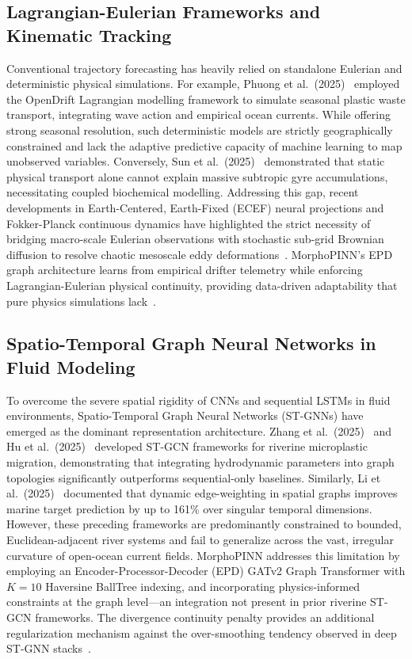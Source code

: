 \documentclass[conference]{IEEEtran}
\begin{document}
\subsection{Lagrangian-Eulerian Frameworks and Kinematic Tracking}
Conventional trajectory forecasting has heavily relied on standalone Eulerian and deterministic physical simulations. For example, Phuong et al.\ (2025)~\cite{ref2} employed the OpenDrift Lagrangian modelling framework to simulate seasonal plastic waste transport, integrating wave action and empirical ocean currents. While offering strong seasonal resolution, such deterministic models are strictly geographically constrained and lack the adaptive predictive capacity of machine learning to map unobserved variables. Conversely, Sun et al.\ (2025)~\cite{ref14} demonstrated that static physical transport alone cannot explain massive subtropic gyre accumulations, necessitating coupled biochemical modelling. Addressing this gap, recent developments in Earth-Centered, Earth-Fixed (ECEF) neural projections and Fokker-Planck continuous dynamics have highlighted the strict necessity of bridging macro-scale Eulerian observations with stochastic sub-grid Brownian diffusion to resolve chaotic mesoscale eddy deformations~\cite{ref25, ref26, ref27}. MorphoPINN's EPD graph architecture learns from empirical drifter telemetry while enforcing Lagrangian-Eulerian physical continuity, providing data-driven adaptability that pure physics simulations lack~\cite{ref38}.

\subsection{Spatio-Temporal Graph Neural Networks in Fluid Modeling}
To overcome the severe spatial rigidity of CNNs and sequential LSTMs in fluid environments, Spatio-Temporal Graph Neural Networks (ST-GNNs) have emerged as the dominant representation architecture. Zhang et al.\ (2025)~\cite{ref1} and Hu et al.\ (2025)~\cite{ref3} developed ST-GCN frameworks for riverine microplastic migration, demonstrating that integrating hydrodynamic parameters into graph topologies significantly outperforms sequential-only baselines. Similarly, Li et al.\ (2025)~\cite{ref15} documented that dynamic edge-weighting in spatial graphs improves marine target prediction by up to 161\% over singular temporal dimensions. However, these preceding frameworks are predominantly constrained to bounded, Euclidean-adjacent river systems and fail to generalize across the vast, irregular curvature of open-ocean current fields. MorphoPINN addresses this limitation by employing an Encoder-Processor-Decoder (EPD) GATv2 Graph Transformer with $K=10$ Haversine BallTree indexing, and incorporating physics-informed constraints at the graph level---an integration not present in prior riverine ST-GCN frameworks. The divergence continuity penalty provides an additional regularization mechanism against the over-smoothing tendency observed in deep ST-GNN stacks~\cite{ref24, ref36}.
\end{document}
